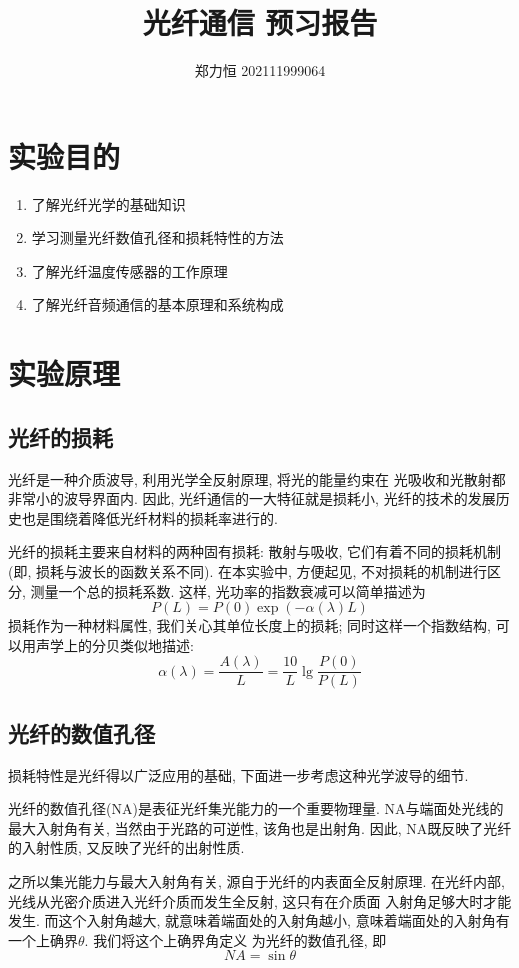 \documentclass[12pt,a4paper]{article}
\title{\vspace{-4cm}\Large 光纤通信 预习报告}  %
\author{\kaishu 郑力恒 202111999064}   %
\date{}
\begin{document}
\maketitle
\section{实验目的}
\begin{enumerate}
\item 了解光纤光学的基础知识
\item 学习测量光纤数值孔径和损耗特性的方法
\item 了解光纤温度传感器的工作原理
\item 了解光纤音频通信的基本原理和系统构成
\end{enumerate}
\section{实验原理}
\subsection{光纤的损耗}
光纤是一种介质波导, 利用光学全反射原理, 将光的能量约束在
光吸收和光散射都非常小的波导界面内. 因此, 光纤通信的一大特征就是损耗小, 
光纤的技术的发展历史也是围绕着降低光纤材料的损耗率进行的. 

光纤的损耗主要来自材料的两种固有损耗: 散射与吸收, 它们有着不同的损耗机制(即, 损耗与波长的函数关系不同).
在本实验中, 方便起见, 不对损耗的机制进行区分, 测量一个总的损耗系数. 这样, 光功率的指数衰减可以简单描述为
$$P(L)=P(0)\exp{(-\alpha(\lambda)L)}$$
损耗作为一种材料属性, 我们关心其单位长度上的损耗; 同时这样一个指数结构, 可以用声学上的分贝类似地描述:
\begin{equation}
\alpha(\lambda)=\frac{A(\lambda)}{L}=\frac{10}{L}\lg{\frac{P(0)}{P(L)}}
\end{equation}

\subsection{光纤的数值孔径}
损耗特性是光纤得以广泛应用的基础, 下面进一步考虑这种光学波导的细节. 

光纤的数值孔径(NA)是表征光纤集光能力的一个重要物理量. NA与端面处光线的最大入射角有关, 当然由于光路的可逆性, 
该角也是出射角. 因此, NA既反映了光纤的入射性质, 又反映了光纤的出射性质. 

之所以集光能力与最大入射角有关, 源自于光纤的内表面全反射原理. 在光纤内部, 光线从光密介质进入光纤介质而发生全反射, 这只有在介质面
入射角足够大时才能发生. 而这个入射角越大, 就意味着端面处的入射角越小, 意味着端面处的入射角有一个上确界$\theta$. 我们将这个上确界角定义
为光纤的数值孔径, 即
\begin{equation}
    NA=\sin{\theta}
\end{equation}
\end{document}

